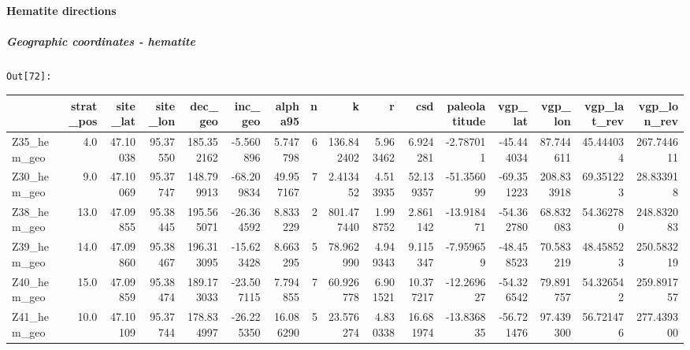 \documentclass[11pt]{article}
\begin{document}
    \begin{center}
    \end{center}
    { \hspace*{\fill} \\}
    
    \paragraph{Hematite directions}\label{hematite-directions}

    \subparagraph{Geographic coordinates -
hematite}\label{geographic-coordinates---hematite}

\texttt{\color{outcolor}Out[{\color{outcolor}72}]:}
\begin{sidewaystable}    
    {\tiny\begin{tabular}{lrrrrrrrrrrrrrrr}
\toprule
{} &  strat\_pos &  site\_lat &  site\_lon &     dec\_geo &    inc\_geo &    alpha95 &  n &           k &         r &        csd &  paleolatitude &    vgp\_lat &     vgp\_lon &  vgp\_lat\_rev &  vgp\_lon\_rev \\
\midrule
Z35\_hem\_geo &        4.0 &  47.10038 &  95.37550 &  185.352162 &  -5.560896 &   5.747798 &  6 &  136.842402 &  5.963462 &   6.924281 &      -2.787011 & -45.444034 &   87.744611 &    45.444034 &   267.744611 \\
Z30\_hem\_geo &        9.0 &  47.10069 &  95.37747 &  148.799913 & -68.209834 &  49.957167 &  7 &    2.413452 &  4.513935 &  52.139357 &     -51.356099 & -69.351223 &  208.833918 &    69.351223 &    28.833918 \\
Z38\_hem\_geo &       13.0 &  47.09855 &  95.38445 &  195.565071 & -26.364592 &   8.833229 &  2 &  801.477440 &  1.998752 &   2.861142 &     -13.918471 & -54.362780 &   68.832083 &    54.362780 &   248.832083 \\
Z39\_hem\_geo &       14.0 &  47.09860 &  95.38467 &  196.313095 & -15.623428 &   8.663295 &  5 &   78.962990 &  4.949343 &   9.115347 &      -7.959659 & -48.458523 &   70.583219 &    48.458523 &   250.583219 \\
Z40\_hem\_geo &       15.0 &  47.09859 &  95.38474 &  189.173033 & -23.507115 &   7.794855 &  7 &   60.926778 &  6.901521 &  10.377217 &     -12.269627 & -54.326542 &   79.891757 &    54.326542 &   259.891757 \\
Z41\_hem\_geo &       10.0 &  47.10109 &  95.37744 &  178.834997 & -26.225350 &  16.086290 &  5 &   23.576274 &  4.830338 &  16.681974 &     -13.836835 & -56.721476 &   97.439300 &    56.721476 &   277.439300 \\

\end{tabular}}
\end{sidewaystable}
\end{document}
